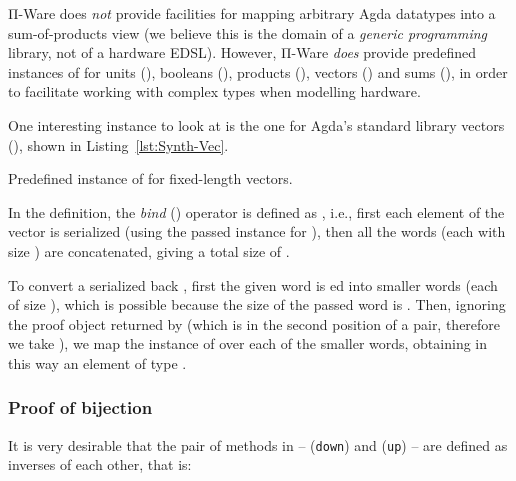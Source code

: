             Π-Ware does \emph{not} provide facilities for mapping arbitrary Agda datatypes into
            a sum-of-products view (we believe this is the domain of a \emph{generic programming} library,
            not of a hardware \ac{EDSL}).
            However, Π-Ware \emph{does} provide predefined instances of  for units (),
            booleans (), products (), vectors () and sums (),
            in order to facilitate working with complex types when modelling hardware.

            One interesting instance to look at is the one for Agda's standard library vectors (),
            shown in Listing~\ref{lst:Synth-Vec}.

            \begin{listing}[h]
                \caption{Predefined instance of  for fixed-length vectors.\label{lst:Synth-Vec}}
            \end{listing}

            In the  definition,
            the \emph{bind} (\AF{>>=}) operator is defined as   , i.e.,
            first each element of the vector is serialized (using the passed instance for ),
            then all the words (each with size ) are concatenated, giving a total size of
            \AY{(} \AF{*} \AY{)}.

            To convert a serialized  back , first the given word is ed
            into  smaller words (each of size ), which is possible because the size of
            the passed word is \AY{(} \AF{*} \AY{)}.
            Then, ignoring the proof object returned by  (which is in the second position
            of a pair, therefore we take ), we map the  instance of  over
            each of the smaller words, obtaining in this way an element of type
              .

            \subsubsection{Proof of bijection}
            \label{subsubsec:proof-bijection}
            It is very desirable that the pair of methods in  –  (\texttt{down}) and
             (\texttt{up}) – are defined as inverses of each other, that is:

